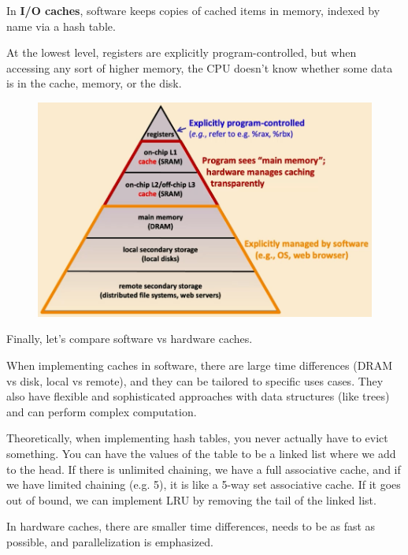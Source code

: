 \documentclass{article}
\begin{document}
      In \textbf{I/O caches}, software keeps copies of cached items in memory, indexed by name via a hash table.

      At the lowest level, registers are explicitly program-controlled, but when accessing any sort of higher memory, the CPU doesn't know whether some data is in the cache, memory, or the disk. 

      \begin{figure}[H]
        \centering 
        \includegraphics[scale=0.4]{img/hierarchy2.png}
        \caption{} 
        \label{fig:hierarchy2}
      \end{figure}

      Finally, let's compare software vs hardware caches. 

      \begin{definition}
        When implementing caches in software, there are large time differences (DRAM vs disk, local vs remote), and they can be tailored to specific uses cases. They also have flexible and sophisticated approaches with data structures (like trees) and can perform complex computation. 
      \end{definition}

      Theoretically, when implementing hash tables, you never actually have to evict something. You can have the values of the table to be a linked list where we add to the head. If there is unlimited chaining, we have a full associative cache, and if we have limited chaining (e.g. 5), it is like a 5-way set associative cache. If it goes out of bound, we can implement LRU by removing the tail of the linked list. 

      \begin{definition}
        In hardware caches, there are smaller time differences, needs to be as fast as possible, and parallelization is emphasized. 
      \end{definition}
\end{document}
